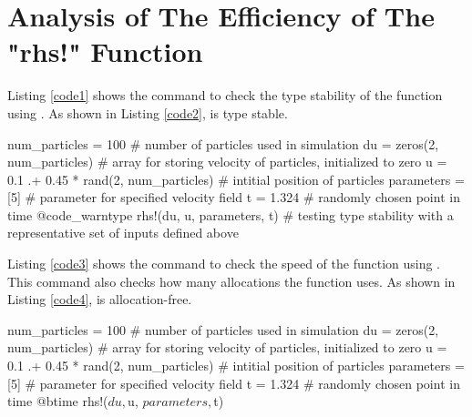 \documentclass{article}
\begin{document}
\section{Analysis of The Efficiency of The "rhs!" Function}

Listing \ref{code1} shows the command to check the type stability of the  function using . As shown in Listing \ref{code2},  is type stable.

{\LARGE
\begin{jllisting}[caption={Type stable check command.}, label=code1]
num_particles = 100 # number of particles used in simulation
du = zeros(2, num_particles) # array for storing velocity of particles, initialized to zero
u = 0.1 .+ 0.45 * rand(2, num_particles) # intitial position of particles
parameters = [5] # parameter for specified velocity field
t = 1.324 # randomly chosen point in time
@code_warntype rhs!(du, u, parameters, t) # testing type stability with a representative set of inputs defined above
\end{jllisting}
}

{\LARGE
{}
}

Listing \ref{code3} shows the command to check the speed of the  function using . This command also checks how many allocations the function uses. As shown in Listing \ref{code4},  is allocation-free.

{\LARGE
\begin{jllisting}[caption={Type stable check command.}, label=code3]
num_particles = 100 # number of particles used in simulation
du = zeros(2, num_particles) # array for storing velocity of particles, initialized to zero
u = 0.1 .+ 0.45 * rand(2, num_particles) # intitial position of particles
parameters = [5] # parameter for specified velocity field
t = 1.324 # randomly chosen point in time
@btime rhs!($du, $u, $parameters, $t)
\end{jllisting}
}
\end{document}
